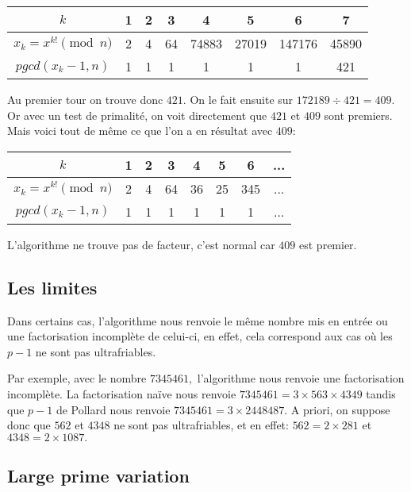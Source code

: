 \documentclass[french, 12pt, titlepage]{article}
\begin{document}
\begin{center}
\begin{tabular}{|c||c|c|c|c|c|c|c|}
\hline
$k$ & 1 & 2 & 3 & 4 & 5 & 6 & 7 \\
\hline
$x_k = x^{k!} \pmod n$ & 2 & 4 & 64 & 74883 & 27019 & 147176 & 45890 \\
\hline
$pgcd(x_k -1, n)$ & 1 & 1 & 1 & 1 & 1 & 1 & 421\\
\hline
\end{tabular}
\end{center}

Au premier tour on trouve donc $421.$ On le fait ensuite sur $172189 \div 421 = 409.$ Or avec un test de primalité, on voit directement que $421$ et $409$ sont premiers. Mais voici tout de même ce que l'on a en résultat avec $409:$ 

\begin{center}
\begin{tabular}{|c||c|c|c|c|c|c|c|}
\hline
$k$ & 1 & 2 & 3 & 4 & 5 & 6 & ... \\
\hline
$x_k = x^{k!} \pmod n$ & 2 & 4 & 64 & 36 & 25 & 345 & ... \\
\hline
$pgcd(x_k -1, n)$ & 1 & 1 & 1 & 1 & 1 & 1 & ...\\
\hline
\end{tabular}
\end{center}

L'algorithme ne trouve pas de facteur, c'est normal car $409$ est premier.

\subsection{Les limites}

Dans certains cas, l'algorithme nous renvoie le même nombre mis en entrée ou une factorisation incomplète de celui-ci, en effet, cela correspond aux cas où les $p-1$ ne sont pas ultrafriables.

Par exemple, avec le nombre $7345461,$ l'algorithme nous renvoie une factorisation incomplète.
La factorisation naïve nous renvoie $7345461 = 3 \times 563 \times 4349$ tandis que $p-1$ de Pollard nous renvoie $7345461 = 3 \times 2448487.$
A priori, on suppose donc que $562$ et $4348$ ne sont pas ultrafriables, et en effet:
$562 = 2 \times 281$ et $4348 = 2 \times 1087.$

\subsection{Large prime variation}
\end{document}
